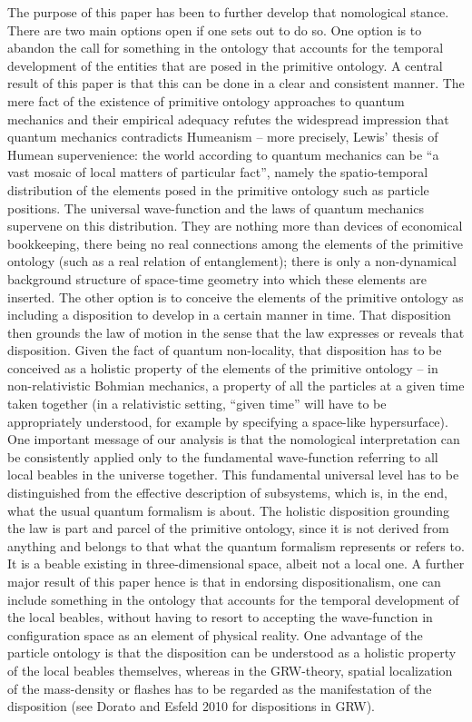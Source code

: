 \documentclass[12pt]{article}
\theoremstyle{definition}
\begin{document}
The purpose of this paper has been to further develop that nomological stance. There are two main options open if one sets out to do so. One option is to abandon the call for something in the ontology that accounts for the temporal development of the entities that are posed in the primitive ontology. A central result of this paper is that this can be done in a clear and consistent manner. The mere fact of the existence of primitive ontology approaches to quantum mechanics and their empirical adequacy refutes the widespread impression that quantum mechanics contradicts Humeanism -- more precisely, Lewis' thesis of Humean supervenience: the world according to quantum mechanics can be ``a vast mosaic of local matters of particular fact'', namely the spatio-temporal distribution of the elements posed in the primitive ontology such as particle positions. The universal wave-function and the laws of quantum mechanics supervene on this distribution. They are nothing more than devices of economical bookkeeping, there being no real connections among the elements of the primitive ontology (such as a real relation of entanglement); there is only a non-dynamical background structure of space-time geometry into which these elements are inserted.
The other option is to conceive the elements of the primitive ontology as including a disposition to develop in a certain manner in time. That disposition then grounds the law of motion in the sense that the law expresses or reveals that disposition. Given the fact of quantum non-locality, that disposition has to be conceived as a holistic property of the elements of the primitive ontology -- in non-relativistic Bohmian mechanics, a property of all the particles at a given time taken together (in a relativistic setting, ``given time'' will have to be appropriately understood, for example by specifying a space-like hypersurface). One important message of our analysis is that the nomological interpretation can be consistently applied only to the fundamental wave-function referring to all local beables in the universe together. This fundamental universal level has to be distinguished from the effective description of subsystems, which is, in the end, what the usual quantum formalism is about.
The holistic disposition grounding the law is part and parcel of the primitive ontology, since it is not derived from anything and belongs to that what the quantum formalism represents or refers to. It is a beable existing in three-dimensional space, albeit not a local one. A further major result of this paper hence is that in endorsing dispositionalism, one can include something in the ontology that accounts for the temporal development of the local beables, without having to resort to accepting the wave-function in configuration space as an element of physical reality. One advantage of the particle ontology is that the disposition can be understood as a holistic property of the local beables themselves, whereas in the GRW-theory, spatial localization of the mass-density or flashes has to be regarded as the manifestation of the disposition (see Dorato and Esfeld 2010 for dispositions in GRW).
\end{document}
